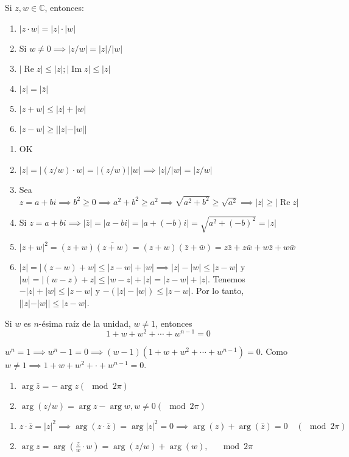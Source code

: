 \begin{prop}
    Si $z,w\in\mathbb{C}$, entonces: 
    \begin{enumerate}
        \item $|z\cdot w|=|z|\cdot |w|$
        \item Si $w\neq 0\implies |z/w|=|z|/|w|$
        \item $|\operatorname{Re}z|\leq |z|;|\operatorname{Im}z|\leq |z|$
        \item $|z|=|\bar{z}|$
        \item $|z+w|\leq |z|+|w|$
        \item $|z-w|\geq ||z|-|w||$
    \end{enumerate}
    \begin{dem}
        \begin{enumerate}
            \item OK
            \item $|z|=|(z/w)\cdot w|=|(z/w)||w|\implies |z|/|w|=|z/w|$
            \item Sea $z=a+bi\implies b^2\geq 0\implies a^2+b^2\geq a^2\implies \sqrt{a^2+b^2}\geq \sqrt{a^2}\implies |z|\geq |\operatorname{Re} z|$
            \item Si $z=a+bi\implies |\bar{z}|=|a-bi|=|a+(-b)i|=\sqrt{a^2+(-b)^2}=|z|$
            \item $|z+w|^2=(z+w)\overline{(z+w)}=(z+w)(\bar{z}+\bar{w})=z\bar{z}+z\bar{w}+w\bar{z}+w\bar{w}$
            \item $|z|=|(z-w)+w|\leq |z-w|+|w|\implies |z|-|w|\leq |z-w|$ y $|w|=|(w-z)+z|\leq |w-z|+|z|=|z-w|+|z|$. Tenemos $-|z|+|w|\leq |z-w|$ y $-(|z|-|w|)\leq |z-w|$. Por lo tanto, 
            $||z|-|w||\leq |z-w|$.
        \end{enumerate}
    \end{dem}
\end{prop}

\begin{ejemplo}
    Si $w$ es $n$-ésima raíz de la unidad, $w\neq 1$, entonces 
    $$1+w+w^2+\cdots + w^{n-1}=0$$
    \begin{sol}
        $w^n=1\implies w^n-1=0\implies (w-1)(1+w+w^2+\cdots + w^{n-1})=0$. Como $w\neq 1\implies 1+w+w^2+\cdot + w^{n-1}=0$.
    \end{sol}
\end{ejemplo}

\begin{ejemplo}
    \begin{enumerate}
        \item $\arg \bar{z}=-\arg z (\mod 2\pi)$
        \item $\arg(z/w)=\arg z -\arg w, w\neq 0 (\mod 2\pi)$
    \end{enumerate}
    \begin{sol}
        \begin{enumerate}
            \item $z\cdot\bar{z}=|z|^2\implies \arg(z\cdot \bar{z})=\arg|z|^2=0\implies \arg(z)+\arg(\bar{z})=0 \quad (\mod 2\pi)$
            \item $\arg z = \arg(\frac{z}{w}\cdot w)=\arg(z/w)+\arg(w),\quad \mod 2\pi$
        \end{enumerate}
    \end{sol}
\end{ejemplo}